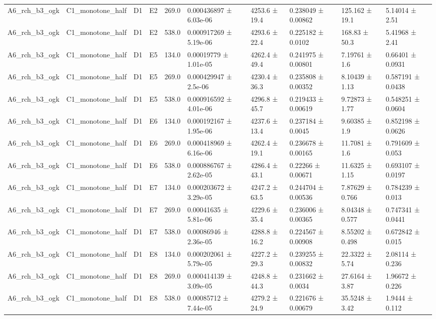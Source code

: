 \begin{table}
\begin{tabular}{llllllllll}
A6\_rch\_b3\_ogk & C1\_monotone\_half & D1 & E2 & 269.0 & 0.000436897 ± 6.03e-06 & 4253.6 ± 19.4 & 0.238049 ± 0.00862 & 125.162 ± 19.1 & 5.14014 ± 2.51 \\
A6\_rch\_b3\_ogk & C1\_monotone\_half & D1 & E2 & 538.0 & 0.000917269 ± 5.19e-06 & 4293.6 ± 22.4 & 0.225182 ± 0.0102 & 168.83 ± 50.3 & 5.41968 ± 2.41 \\
A6\_rch\_b3\_ogk & C1\_monotone\_half & D1 & E5 & 134.0 & 0.00019779 ± 1.01e-05 & 4262.4 ± 49.4 & 0.241975 ± 0.00801 & 7.19761 ± 1.6 & 0.66401 ± 0.0931 \\
A6\_rch\_b3\_ogk & C1\_monotone\_half & D1 & E5 & 269.0 & 0.000429947 ± 2.5e-06 & 4230.4 ± 36.3 & 0.235808 ± 0.00352 & 8.10439 ± 1.13 & 0.587191 ± 0.0438 \\
A6\_rch\_b3\_ogk & C1\_monotone\_half & D1 & E5 & 538.0 & 0.000916592 ± 4.01e-06 & 4296.8 ± 45.7 & 0.219433 ± 0.00619 & 9.72873 ± 1.77 & 0.548251 ± 0.0604 \\
A6\_rch\_b3\_ogk & C1\_monotone\_half & D1 & E6 & 134.0 & 0.000192167 ± 1.95e-06 & 4237.6 ± 13.4 & 0.237184 ± 0.0045 & 9.60385 ± 1.9 & 0.852198 ± 0.0626 \\
A6\_rch\_b3\_ogk & C1\_monotone\_half & D1 & E6 & 269.0 & 0.000418969 ± 6.16e-06 & 4262.4 ± 19.1 & 0.236678 ± 0.00165 & 11.7081 ± 1.6 & 0.791609 ± 0.053 \\
A6\_rch\_b3\_ogk & C1\_monotone\_half & D1 & E6 & 538.0 & 0.000886767 ± 2.62e-05 & 4286.4 ± 43.1 & 0.22266 ± 0.00671 & 11.6325 ± 1.15 & 0.693107 ± 0.0197 \\
A6\_rch\_b3\_ogk & C1\_monotone\_half & D1 & E7 & 134.0 & 0.000203672 ± 3.29e-05 & 4247.2 ± 63.5 & 0.244704 ± 0.00536 & 7.87629 ± 0.766 & 0.784239 ± 0.013 \\
A6\_rch\_b3\_ogk & C1\_monotone\_half & D1 & E7 & 269.0 & 0.00041635 ± 5.81e-06 & 4229.6 ± 35.4 & 0.236006 ± 0.00365 & 8.04348 ± 0.577 & 0.747341 ± 0.0441 \\
A6\_rch\_b3\_ogk & C1\_monotone\_half & D1 & E7 & 538.0 & 0.00086946 ± 2.36e-05 & 4288.8 ± 16.2 & 0.224567 ± 0.00908 & 8.55202 ± 0.498 & 0.672842 ± 0.015 \\
A6\_rch\_b3\_ogk & C1\_monotone\_half & D1 & E8 & 134.0 & 0.000202061 ± 5.79e-05 & 4227.2 ± 29.3 & 0.239255 ± 0.00832 & 22.3322 ± 5.74 & 2.08114 ± 0.236 \\
A6\_rch\_b3\_ogk & C1\_monotone\_half & D1 & E8 & 269.0 & 0.000414139 ± 3.09e-05 & 4248.8 ± 44.3 & 0.231662 ± 0.0034 & 27.6164 ± 3.87 & 1.96672 ± 0.226 \\
A6\_rch\_b3\_ogk & C1\_monotone\_half & D1 & E8 & 538.0 & 0.00085712 ± 7.44e-05 & 4279.2 ± 24.9 & 0.221676 ± 0.00679 & 35.5248 ± 3.42 & 1.9444 ± 0.112 \\

\end{tabular}
\end{table}
